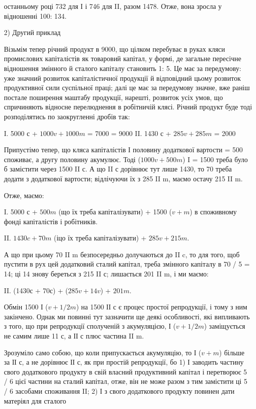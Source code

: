 \parcont{}  %
останньому році 732 для І і 746 для II, разом 1478. Отже, вона
зросла у відношенні 100: 134.

2) Другий приклад

Візьмім тепер річний продукт в 9000, що цілком перебуває в руках
кляси промислових капіталістів як товаровий капітал, у формі, де загальне
пересічне відношення змінного й сталого капіталу становить 1: 5.
Це має за передумову: уже значний розвиток капіталістичної продукції
й відповідний цьому розвиток продуктивної сили суспільної праці; далі
це має за передумову значне, вже раніш постале поширення маштабу
продукції, нарешті, розвиток усіх умов, що спричиняють відносне перелюднення
в робітничій клясі. Річний продукт буде тоді розподілятись по
заокругленні дробів так:

I.  5000 с + $1000 v + 1000 m$ = 7000  = 9000
II. 1430 с + $285 v + 285 m$ = 2000

Припустімо тепер, що кляса капіталістів І половину додаткової вартости
= 500 споживає, а другу половину акумулює. Тоді ($1000 v +
500 m$) I = 1500 треба було б замістити через 1500 II с. А що II с
дорівнює тут лише 1430, то 70 треба додати з додаткової вартости;
відлічуючи їх з 285 II m, маємо остачу 215 II m.

Отже, маємо:

I.  5000 с + $500 m$ (що їх треба капіталізувати) + 1500 ($v + m$) в споживному
фонді капіталістів і робітників.

II.  $1430 c + 70 m$ (іцо їх треба капіталізувати) + $285 v + 215 m$.

А що при цьому 70 II m безпосередньо долучаються до II c, то для
того, щоб пустити в рух цей додатковий сталий капітал, треба змінного
капіталу в 70 / 5 = 14; ці 14 знову береться з 215 II с; лишається 201 II m,
і ми маємо:

II. (1430с + 70с) + ($285 v + 14 v$) + $201 m$.

Обмін 1500 І ($v + 1 / 2 m$) на 1500 ІІ с є процес простої репродукції,
і тому з ним закінчено. Однак ми повинні тут зазначити ще деякі особливості,
які випливають з того, що при репродукції сполученій з акумуляцією,
І ($v + 1 / 2 m$) заміщується не самим лише 11 с, а ІІ с плюс частина
II m.

Зрозуміло само собою, що коли припускається акумуляцію, то І ($v + m$)
більше за ІІ с, а не дорівнює ІІ с, як при простій репродукції, бо
1) І заводить частину свого додаткового продукту в свій власний
продуктивний капітал і перетворює 5 / 6 цієї частини на сталий капітал,
отже, він не може разом з тим замістити ці 5 / 6 засобами споживання II;
2) І з свого додаткового продукту повинен дати матеріял для сталого
\parbreak{}  %

